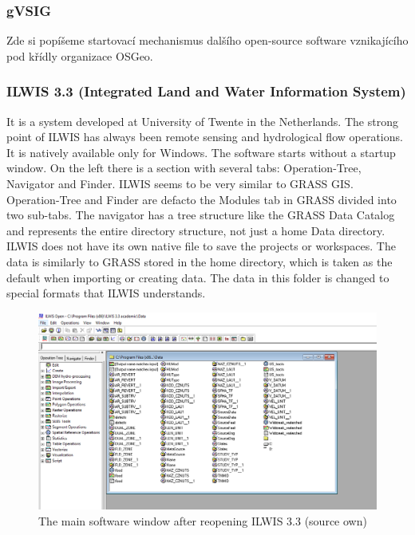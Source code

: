\documentclass[a4paper,10pt,twoside]{article}
\begin{document}
\newpage
\vspace*{-1cm}
\subsubsection{gVSIG}
\noindent
\large
Zde si popíšeme startovací mechanismus dalšího open-source software vznikajícího pod křídly organizace OSGeo.

\newpage
\vspace*{-1cm}
\subsubsection{ILWIS 3.3 (Integrated Land and Water Information System)}
\noindent
\large
It is a system developed at University of Twente in the Netherlands. The strong point of ILWIS has always been remote sensing and hydrological flow operations. It is natively available only for Windows. The software starts without a startup window. On the left there is a section with several tabs: Operation-Tree, Navigator and Finder. ILWIS seems to be very similar to GRASS GIS. Operation-Tree and Finder are defacto the Modules tab in GRASS divided into two sub-tabs. The navigator has a tree structure like the GRASS Data Catalog and represents  the entire directory structure, not just a home Data directory. ILWIS does not have its own native file to save the projects or workspaces. The data is similarly to GRASS stored in the home directory, which is taken as the default when importing or creating data. The data in this folder is changed to special formats that ILWIS understands.

\vspace{0.3cm}
\begin{figure}[hbt!] 
\begin{center}
\includegraphics[width=15cm]{../pictures/ilwis_uvodni_okno.png} 
\caption[The main software window after reopening ILWIS 3.3 (source own)]{The main software window after reopening ILWIS 3.3 (source own)}
\label{fig:ilwis_uvodni_okno.png}
\end{center}
\end{figure}
\end{document}
